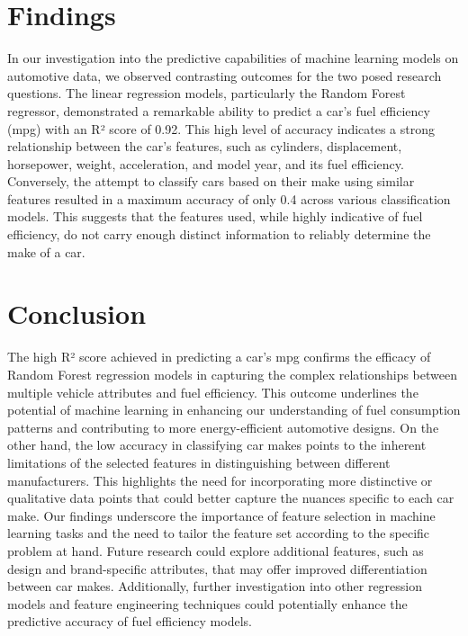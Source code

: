 \documentclass[a4paper, twocolumn]{article}
\begin{document}

\section{Findings\label{sec:Findings}}
In our investigation into the predictive capabilities of machine learning models on automotive data, we observed contrasting outcomes for the two posed research questions. The linear regression models, particularly the Random Forest regressor, demonstrated a remarkable ability to predict a car's fuel efficiency (mpg) with an R² score of 0.92. This high level of accuracy indicates a strong relationship between the car's features, such as cylinders, displacement, horsepower, weight, acceleration, and model year, and its fuel efficiency.
Conversely, the attempt to classify cars based on their make using similar features resulted in a maximum accuracy of only 0.4 across various classification models. This suggests that the features used, while highly indicative of fuel efficiency, do not carry enough distinct information to reliably determine the make of a car.

\section{Conclusion\label{sec:Conclusion}}

The high R² score achieved in predicting a car's mpg confirms the efficacy of Random Forest regression models in capturing the complex relationships between multiple vehicle attributes and fuel efficiency. This outcome underlines the potential of machine learning in enhancing our understanding of fuel consumption patterns and contributing to more energy-efficient automotive designs.
On the other hand, the low accuracy in classifying car makes points to the inherent limitations of the selected features in distinguishing between different manufacturers. This highlights the need for incorporating more distinctive or qualitative data points that could better capture the nuances specific to each car make.
Our findings underscore the importance of feature selection in machine learning tasks and the need to tailor the feature set according to the specific problem at hand. Future research could explore additional features, such as design and brand-specific attributes, that may offer improved differentiation between car makes. Additionally, further investigation into other regression models and feature engineering techniques could potentially enhance the predictive accuracy of fuel efficiency models.

\end{document}
